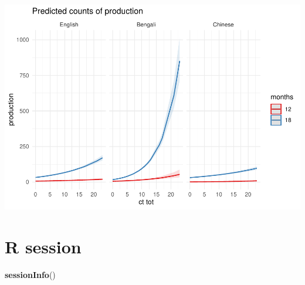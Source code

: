 \documentclass[]{article}
\newenvironment{Shaded}{\begin{snugshade}}{\end{snugshade}}
\newcommand{\KeywordTok}[1]{\textcolor[rgb]{0.13,0.29,0.53}{\textbf{#1}}}
\newcommand{\NormalTok}[1]{#1}
\begin{document}
\includegraphics{supplement_files/figure-latex/ct-lm-2-undsay-plot-1.pdf}

\newpage

\hypertarget{r-session}{%
\section{R session}\label{r-session}}

\begin{Shaded}
\begin{Highlighting}[]
\KeywordTok{sessionInfo}\NormalTok{()}
\end{Highlighting}
\end{Shaded}
\end{document}
